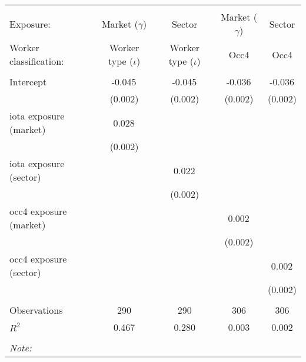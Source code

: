 \begin{tabular}{@{\extracolsep{5pt}}lcccc}
\\[-1.8ex]\hline
\hline \\[-1.8ex]
\hline \\[-1.8ex]
 Exposure: & Market ($\gamma$) & Sector & Market ($\gamma$) & Sector \\
 Worker classification: & Worker type ($\iota$) & Worker type ($\iota$) & Occ4 & Occ4 \\
 \hline &  &  &  &  \\
 Intercept & -0.045$^{}$ & -0.045$^{}$ & -0.036$^{}$ & -0.036$^{}$ \\
  & (0.002) & (0.002) & (0.002) & (0.002) \\
 iota exposure (market) & 0.028$^{}$ & & & \\
  & (0.002) & & & \\
 iota exposure (sector) & & 0.022$^{}$ & & \\
  & & (0.002) & & \\
 occ4 exposure (market) & & & 0.002$^{}$ & \\
  & & & (0.002) & \\
 occ4 exposure (sector) & & & & 0.002$^{}$ \\
  & & & & (0.002) \\
\hline \\[-1.8ex]
 Observations & 290 & 290 & 306 & 306 \\
 $R^2$ & 0.467 & 0.280 & 0.003 & 0.002 \\
\hline
\hline \\[-1.8ex]
\textit{Note:}\end{tabular}